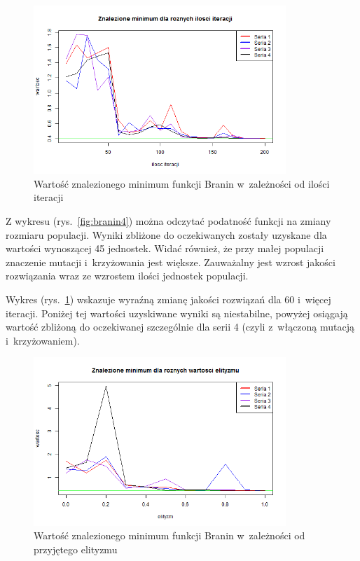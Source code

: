\documentclass[11pt, a4paper]{article}
\newcommand{\fbi}{\leavevmode{\parindent=1em\indent}}
\begin{document}
\begin{figure}[H]
	\centering
	\includegraphics[width=0.85\textwidth]{./assets/Branin5.png}
	\caption{Wartość znalezionego minimum funkcji Branin w~zależności od ilości iteracji}
	\label{fig:branin5}
\end{figure}

\fbi
Z wykresu (rys.~\ref{fig:branin4}) można odczytać podatność funkcji na zmiany rozmiaru populacji. Wyniki zbliżone do oczekiwanych zostały uzyskane dla wartości wynoszącej 45 jednostek. Widać również, że przy małej populacji znaczenie mutacji i~krzyżowania jest większe. Zauważalny jest wzrost jakości rozwiązania wraz ze wzrostem ilości jednostek populacji.

\fbi
Wykres (rys.~\ref{fig:branin5}) wskazuje wyraźną zmianę jakości rozwiązań dla 60 i~więcej iteracji. Poniżej tej wartości uzyskiwane wyniki są niestabilne, powyżej osiągają wartość zbliżoną do oczekiwanej szczególnie dla serii 4 (czyli z~włączoną mutacją i~krzyżowaniem).

\begin{figure}[H]
	\centering
	\includegraphics[width=0.85\textwidth]{./assets/Branin6.png}
	\caption{Wartość znalezionego minimum funkcji Branin w~zależności od przyjętego elityzmu}
	\label{fig:branin6}
\end{figure}
\end{document}
